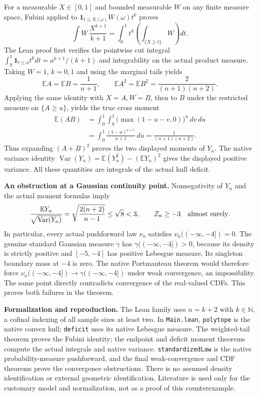 \documentclass[10pt,a4paper]{article}
\newcommand{\E}{\mathbb E}
\newcommand{\Var}{\operatorname{Var}}
\begin{document}
For a measurable $X\in[0,1]$ and bounded measurable $W$ on any finite measure
space, Fubini applied to
$\mathbf1_{t\le X(\omega)}W(\omega)t^k$ proves
\[
 \int W\,\frac{X^{k+1}}{k+1}
 =\int_0^1 t^k\left(\int_{\{X\ge t\}}W\right)dt.
\]
The Lean proof first verifies the pointwise cut integral
$\int_0^1\mathbf1_{t\le a}t^kdt=a^{k+1}/(k+1)$ and integrability on the
actual product measure. Taking $W=1$, $k=0,1$ and using the marginal tails yields
\[
 \E A=\E B=\frac1{n+1},\qquad
 \E A^2=\E B^2=\frac2{(n+1)(n+2)}.
\]
Applying the same identity with $X=A,W=B$, then to $B$ under the restricted
measure on $\{A\ge u\}$, yields the true cross moment
\[
\begin{aligned}
 \E(AB)
 &=\int_0^1\int_0^1\bigl(\max(1-u-v,0)\bigr)^n\,dv\,du\\
 &=\int_0^1\frac{(1-u)^{n+1}}{n+1}\,du
 =\frac1{(n+1)(n+2)}.
\end{aligned}
\]
Thus expanding $(A+B)^2$ proves the two displayed moments of $Y_n$.
The native variance identity $\Var(Y_n)=\E(Y_n^2)-(\E Y_n)^2$ gives the displayed
positive variance. All these quantities are integrals of the actual hull deficit.

\textbf{An obstruction at a Gaussian continuity point.}
Nonnegativity of $Y_n$ and the actual moment formulas imply
\[
 \frac{\E Y_n}{\sqrt{\Var(Y_n)}}
 =\sqrt{\frac{2(n+2)}{n-1}}\le\sqrt8<3,
 \qquad Z_n\ge-3\quad\hbox{almost surely}.
\]
In particular, every actual pushforward law $\nu_n$ satisfies
$\nu_n(({-\infty},-4])=0$. The genuine standard Gaussian measure $\gamma$ has
$\gamma(({-\infty},-4])>0$, because its density is strictly positive and
$[-5,-4]$ has positive Lebesgue measure. Its singleton boundary mass at $-4$ is zero.
The native Portmanteau theorem would therefore force
$\nu_n(({-\infty},-4])\to\gamma(({-\infty},-4])$ under weak convergence, an
impossibility. The same point directly contradicts convergence of the real-valued
CDFs. This proves both failures in the theorem.

\textbf{Formalization and reproduction.}
The Lean family uses $n=k+2$ with $k\in\mathbb N$, a cofinal indexing of all sample
sizes at least two. In \texttt{Main.lean}, \texttt{polytope} is the native convex
hull; \texttt{deficit} uses its native Lebesgue measure. The weighted-tail theorem
proves the Fubini identity; the endpoint and deficit moment theorems compute the
actual integrals and native variance. \texttt{standardizedLaw} is the native
probability-measure pushforward, and the final weak-convergence and CDF theorems
prove the convergence obstructions. There is no assumed density identification
or external geometric identification. Literature is used only for the customary
model and normalization, not as a proof of this counterexample.
\end{document}
